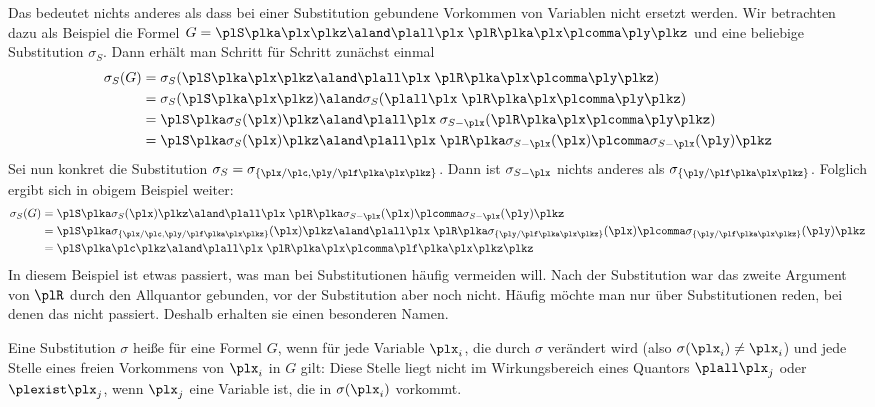 %
Das bedeutet nichts anderes als dass bei einer Substitution gebundene
Vorkommen von Variablen nicht  ersetzt werden.
%
Wir betrachten dazu als Beispiel die Formel
$G = \plS\plka\plx\plkz \aland \plall\plx \;
\plR\plka\plx\plcomma\ply\plkz$ und eine beliebige Substitution
$\sigma_S$.
%
Dann erhält man Schritt für Schritt zunächst einmal
\begin{align*}
  \sigma_S(G) 
  &= \sigma_S(\plS\plka\plx\plkz \aland \plall\plx \; \plR\plka\plx\plcomma\ply\plkz) \\
  &= \sigma_S(\plS\plka\plx\plkz) \aland \sigma_S(\plall\plx \; \plR\plka\plx\plcomma\ply\plkz) \\
  &= \plS\plka\sigma_S(\plx)\plkz \aland \plall\plx \; \sigma_{S-\plx}(\plR\plka\plx\plcomma\ply\plkz) \\
  &= \plS\plka\sigma_S(\plx)\plkz \aland \plall\plx \; \plR\plka\sigma_{S-\plx}(\plx)\plcomma\sigma_{S-\plx}(\ply)\plkz
\end{align*}
%
Sei nun konkret die Substitution
$\sigma_S=\sigma_{\{\plx/\plc, \ply/\plf\plka\plx\plkz\}}$.
%
Dann ist $\sigma_{S-\plx}$ nichts anderes als
$\sigma_{\{\ply/\plf\plka\plx\plkz\}}$.
%
Folglich ergibt sich in obigem Beispiel weiter:
%
\begin{align*}
  \sigma_S(G) 
  &= \plS\plka\sigma_S(\plx)\plkz \aland \plall\plx \; \plR\plka\sigma_{S-\plx}(\plx)\plcomma\sigma_{S-\plx}(\ply)\plkz \\
  &= \plS\plka\sigma_{\{\plx/\plc, \ply/\plf\plka\plx\plkz\}}(\plx)\plkz \aland \plall\plx \; \plR\plka\sigma_{\{\ply/\plf\plka\plx\plkz\}}(\plx)\plcomma\sigma_{\{\ply/\plf\plka\plx\plkz\}}(\ply)\plkz \\
  &= \plS\plka\plc\plkz \aland \plall\plx \; \plR\plka\plx\plcomma\plf\plka\plx\plkz\plkz
\end{align*}
%
In diesem Beispiel ist etwas passiert, was man bei Substitutionen
häufig vermeiden will.
%
Nach der Substitution war das zweite Argument von $\plR$ durch den
Allquantor gebunden, vor der Substitution aber noch nicht.
%
Häufig möchte man nur über Substitutionen reden, bei denen das nicht
passiert.
%
Deshalb erhalten sie einen besonderen Namen.

Eine Substitution $\sigma$ heiße %
 für eine Formel $G$, wenn für
jede Variable $\plx_i$, die durch $\sigma$ verändert wird (also
$\sigma(\plx_i)\not=\plx_i$) und  jede Stelle eines freien Vorkommens von $\plx_i$ in
$G$ gilt: Diese Stelle liegt nicht im Wirkungsbereich eines Quantors
$\plall \plx_j$ oder $\plexist \plx_j$, wenn $\plx_j$ eine Variable ist, die in
$\sigma(\plx_i)$ vorkommt.


